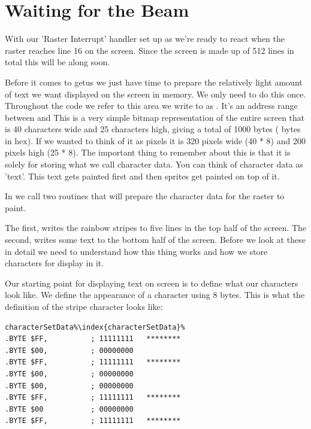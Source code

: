 \section{Waiting for the Beam}
With our 'Raster Interrupt' handler set up as  we're ready to 
react when the raster reaches line 16 on the screen. Since the screen is made up of 512 lines in
total this will be along soon.

Before it comes to getus we just have time to prepare the relatively light amount of text we want displayed
on the screen in memory. We only need to do this once. Throughout the code we refer to this
area we write to as . It's an address range between  and  This is a very
simple bitmap representation of the entire screen that is 40 characters wide and 25 characters high,
giving a total of 1000 bytes ( bytes in hex). If we wanted to think of it as pixels it is 320 pixels wide (40 * 8)
and 200 pixels high (25 * 8). The important thing to remember about this  is that it is solely
for storing what we call character data. You can think of character data as 'text'. This text gets painted
first and then sprites get painted on top of it.

In  we call two routines that will prepare the character data for the raster to paint. 

The first,  writes the rainbow stripes to five lines in the top half of the screen. 
The second,  writes some text to the bottom half of the screen. Before we look at these
in detail we need to understand how this thing  works and how we store characters for display in it.

Our starting point for displaying text on screen is to define what our characters look like. We define the appearance
of a character using 8 bytes. This is what the definition of the stripe character looks like: 

\clearpage
\begin{lstlisting}[caption= The 'stripe' character\index{character}.,escapechar=\%]
characterSetData%\index{characterSetData}%
.BYTE $FF,          ; 11111111   ********
.BYTE $00,          ; 00000000           
.BYTE $FF,          ; 11111111   ********
.BYTE $00,          ; 00000000           
.BYTE $00,          ; 00000000           
.BYTE $FF,          ; 11111111   ********
.BYTE $00           ; 00000000           
.BYTE $FF,          ; 11111111   ********
\end{lstlisting}

